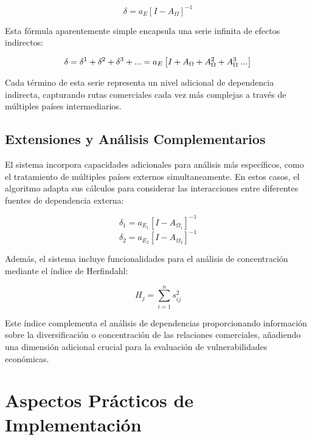 \documentclass[authoryear]{elsarticle}
\begin{document}
\begin{equation}
\delta = a_E[I - A_{\Omega}]^{-1}
\end{equation}

Esta fórmula aparentemente simple encapsula una serie infinita de efectos indirectos:

\begin{equation}
\delta = \delta^1 + \delta^2 + \delta^3 + ... = a_E \left[I + A_{\Omega} + A_{\Omega}^2+ A_{\Omega}^3 \hspace{0.1cm}...\right]
\end{equation}

Cada término de esta serie representa un nivel adicional de dependencia indirecta, capturando rutas comerciales cada vez más complejas a través de múltiples países intermediarios.

\subsection{Extensiones y Análisis Complementarios}

El sistema incorpora capacidades adicionales para análisis más específicos, como el tratamiento de múltiples países externos simultaneamente. En estos casos, el algoritmo adapta sus cálculos para considerar las interacciones entre diferentes fuentes de dependencia externa:

\begin{equation}
\delta_1 = a_{E_1} [I - A_{\Omega_1}]^{-1}
\end{equation}
\begin{equation}
\delta_2 = a_{E_2} [I - A_{\Omega_2}]^{-1}
\end{equation}

Además, el sistema incluye funcionalidades para el análisis de concentración mediante el índice de Herfindahl:

\begin{equation}
H_j = \sum_{i=1}^{n} s_{ij}^2
\end{equation}

Este índice complementa el análisis de dependencias proporcionando información sobre la diversificación o concentración de las relaciones comerciales, añadiendo una dimensión adicional crucial para la evaluación de vulnerabilidades económicas.

\section{Aspectos Prácticos de Implementación}
\end{document}
